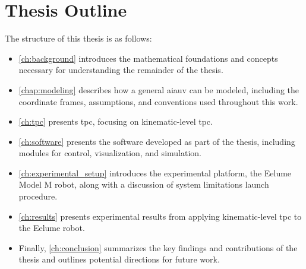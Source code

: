 
\newpage
\section{Thesis Outline}

The structure of this thesis is as follows:

\begin{itemize}
    \item \autoref{ch:background} introduces the mathematical foundations and concepts necessary for understanding the remainder of the thesis.
    \item \autoref{chap:modeling} describes how a general \gls{aiauv} can be modeled, including the coordinate frames, assumptions, and conventions used throughout this work. 
    \item \autoref{ch:tpc} presents \gls{tpc}, focusing on kinematic-level \gls{tpc}.
    \item \autoref{ch:software} presents the software developed as part of the thesis, including modules for control, visualization, and simulation.
    \item \autoref{ch:experimental_setup} introduces the experimental platform, the Eelume Model M robot, along with a discussion of system limitations launch procedure.
    \item \autoref{ch:results} presents experimental results from applying kinematic-level \gls{tpc} to the Eelume robot.
    \item Finally, \autoref{ch:conclusion} summarizes the key findings and contributions of the thesis and outlines potential directions for future work.
\end{itemize}


